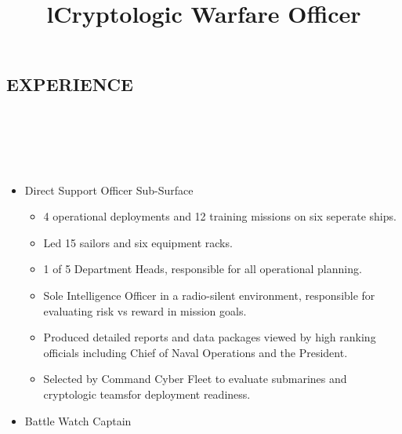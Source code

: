 \documentclass[line, margin]{resume}
\begin{document}
\address{20 Rhode Island Dr \\ Newport, RI 02840 \\ (203) 376-9329}
\address{http://russellshomberg.com \\ LinkedIn \\ russellshomberg@gmail.com}

\begin{resume}

  \section{EXPERIENCE}
  
  \begin{format}
    \title{l}\\
    \\
    \body\\
    \\
  \end{format}
  
  \title{Cryptologic Warfare Officer}
  
  \begin{position}
    \begin{itemize}
    \item Direct Support Officer Sub-Surface
      \begin{itemize}
       \item 4 operational deployments and 12 training missions on six seperate ships.
       \item Led 15 sailors and six equipment racks.
       \item 1 of 5 Department Heads, responsible for all operational planning.
       \item Sole Intelligence Officer in a radio-silent environment, responsible for evaluating risk vs reward in mission goals.
       \item Produced detailed reports and data packages viewed by high ranking officials including Chief of Naval Operations and the President.
       \item Selected by Command Cyber Fleet to evaluate submarines and cryptologic teamsfor deployment readiness. 
      \end{itemize}
    \item Battle Watch Captain
      \begin{itemize}


\end{itemize}
\end{itemize}
\end{position}
\end{resume}
\end{document}
